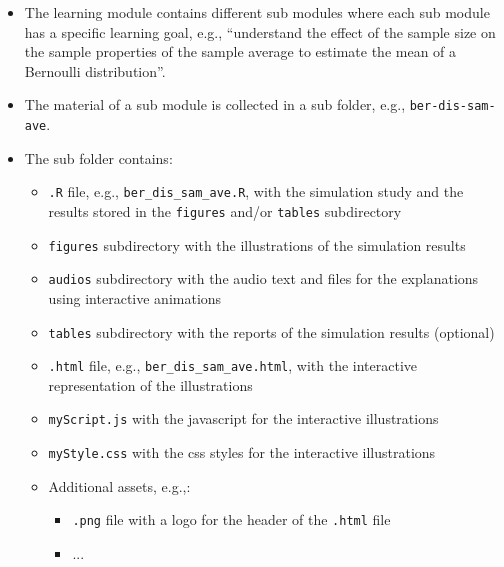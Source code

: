 \documentclass[12pt]{article}
\begin{document}
\begin{itemize}
	\item The learning module contains different sub modules where each sub module has a specific learning goal, e.g., ``understand the effect of the sample size on the sample properties of the sample average to estimate the mean of a Bernoulli distribution''.
	\item The material of a sub module is collected in a sub folder, e.g., \texttt{ber-dis-sam-ave}.
	\item The sub folder contains:
	\begin{itemize}
		\item \texttt{.R} file, e.g., \texttt{ber\_dis\_sam\_ave.R}, with the simulation study and the results stored in the \texttt{figures} and/or \texttt{tables} subdirectory
		\item \texttt{figures} subdirectory with the illustrations of the simulation results
		\item \texttt{audios} subdirectory with the audio text and files for the explanations using interactive animations
		\item \texttt{tables} subdirectory with the reports of the simulation results (optional)
		\item \texttt{.html} file, e.g., \texttt{ber\_dis\_sam\_ave.html}, with the interactive representation of the illustrations
		\item \texttt{myScript.js} with the javascript for the interactive illustrations
		\item \texttt{myStyle.css} with the css styles for the interactive illustrations
		\item Additional assets, e.g.,:
		\begin{itemize}
			\item \texttt{.png} file with a logo for the header of the \texttt{.html} file
			\item ...
		\end{itemize}
	\end{itemize}
\end{itemize}







	
\end{document}
